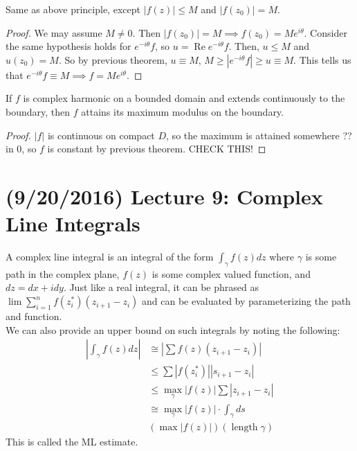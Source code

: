 \documentclass[11pt,leqno,oneside]{amsart}
\numberwithin{thm}{section}
\renewcommand{\Re}{\operatorname{Re}}
\begin{document}
  \begin{thm}
    Same as above principle, except $|f(z)| \leq M$ and $|f(z_0)| =
    M$.
  \end{thm}
  \begin{proof}
    We may assume $M \neq 0$. Then $|f(z_0)| = M \implies f(z_0) =
    Me^{i\theta}$. Consider the same hypothesis holds for
    $e^{-i\theta}f$, so $u = \Re e^{-i\theta}f$. Then, $u \leq M$ and
    $u(z_0) = M$. So by previous theorem, $u \equiv M$, $M \geq
    |e^{-i\theta}f| \geq u \equiv M$. This tells us that
    $e^{-i\theta}f \equiv M \implies f = Me^{i\theta}$.
  \end{proof}
  \begin{thm}
    If $f$ is complex harmonic on a bounded domain and extends
    continuously to the boundary, then $f$ attains its maximum modulus
    on the boundary.
  \end{thm}
  \begin{proof}
    $|f|$ is continuous on compact $D$, so the maximum is attained
    somewhere ?? in 0, so $f$ is constant by previous theorem. CHECK THIS!
  \end{proof}
  \section{(9/20/2016) Lecture 9: Complex Line Integrals}
  A complex line integral is an integral of the form $\int_\gamma
  f(z)dz$ where $\gamma$ is some path in the complex plane, $f(z)$ is
  some complex valued function, and $dz = dx + idy$. Just like a real
  integral, it can be phrased as $\lim \sum_{i=1}^n
  f(z_i^*)(z_{i+1}-z_i)$ and can be evaluated by parameterizing the
  path and function. \\

  We can also provide an upper bound on such integrals by noting the
  following:
  \begin{align*}
    |\int_\gamma f(z)dz | & \cong |\sum f(z)(z_{i+1}-z_i)| \\
    \ & \leq \sum |f(z_i^*)||s_{i+1}-z_i| \\
    \ & \leq \max_\gamma |f(z)| \sum |z_{i+1}-z_i| \\
    \ & \cong \max_\gamma |f(z)| \cdot \int_\gamma ds \\
    \ & (\max |f(z)|)(\operatorname{length} \gamma)
  \end{align*}
  This is called the ML estimate.
\end{document}
